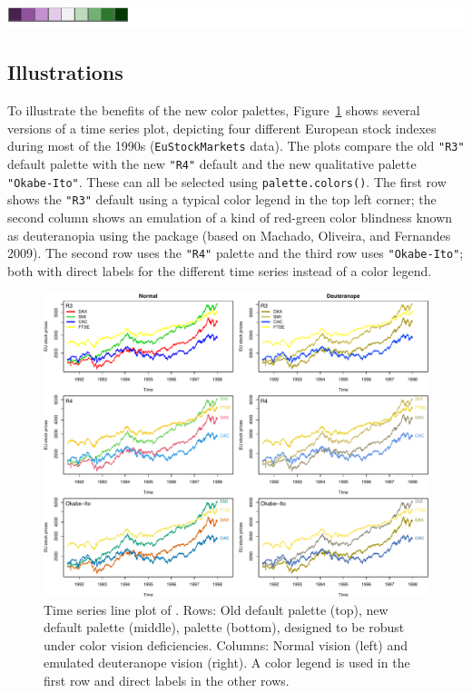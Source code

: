 \includegraphics[width=1\linewidth]{color_files/figure-latex/PurpleGreen-1}

\hypertarget{illustrations}{%
\subsection{Illustrations}\label{illustrations}}

To illustrate the benefits of the new color palettes,
Figure~\ref{fig:tsplot} shows several versions of a time series plot,
depicting four different European stock indexes during most of the 1990s
(\texttt{EuStockMarkets} data). The plots compare
the old \texttt{"R3"} default palette with
the new \texttt{"R4"} default and the new qualitative palette
\texttt{"Okabe-Ito"}.
These can all be selected using \texttt{palette.colors()}.
The first row shows the \texttt{"R3"} default using a typical color legend in the top left corner;
the second column shows an emulation of a kind of red-green
color blindness known as deuteranopia using the  package
(based on Machado, Oliveira, and Fernandes 2009).
The second row uses the \texttt{"R4"} palette and the third row
uses \texttt{"Okabe-Ito"}; both with direct labels for the different time series instead of
a color legend.

\begin{figure}[h!]

{\centering \includegraphics[width=1\linewidth]{color_files/figure-latex/tsplot-1} 

}

\caption{Time series line plot of . Rows: Old  default palette (top), new  default palette (middle),  palette (bottom), designed to be robust under color vision deficiencies. Columns: Normal vision (left) and emulated deuteranope vision (right). A color legend is used in the first row and direct labels in the other rows.}\label{fig:tsplot}
\end{figure}

